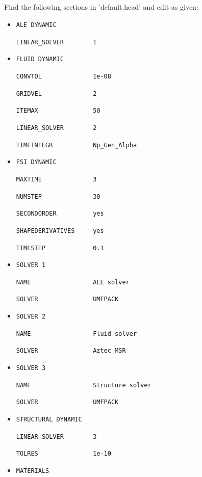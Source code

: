 \subsection{\head}
Find the following sections in 'default.head' and edit as given:
\begin{itemize}

 \item \verb|ALE DYNAMIC|

 \verb|LINEAR_SOLVER        1|

 \item \verb|FLUID DYNAMIC|

 \verb|CONVTOL              1e-08|
 
 \verb|GRIDVEL              2|
 
 \verb|ITEMAX               50|
 
 \verb|LINEAR_SOLVER        2|
 
 \verb|TIMEINTEGR           Np_Gen_Alpha|
 
 \item \verb|FSI DYNAMIC|

 \verb|MAXTIME              3|
 
 \verb|NUMSTEP              30|
 
 \verb|SECONDORDER          yes|

 \verb|SHAPEDERIVATIVES     yes|
 
 \verb|TIMESTEP             0.1|

 \item \verb|SOLVER 1|
 
 \verb|NAME                 ALE solver|

 \verb|SOLVER               UMFPACK|

 \item \verb|SOLVER 2|
 
 \verb|NAME                 Fluid solver|

 \verb|SOLVER               Aztec_MSR|

 \item \verb|SOLVER 3|
 
 \verb|NAME                 Structure solver|

 \verb|SOLVER               UMFPACK|

 \item \verb|STRUCTURAL DYNAMIC|

 \verb|LINEAR_SOLVER        3|
 
 \verb|TOLRES               1e-10|

 \item \verb|MATERIALS|
 

\end{itemize}
